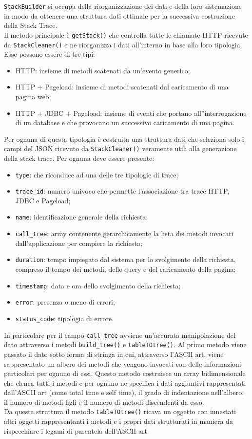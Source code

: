 \texttt{StackBuilder} si occupa della riorganizzazione dei dati e della loro sistemazione in modo da ottenere una struttura dati ottimale per la successiva costruzione della Stack Trace.\\
Il metodo principale è \texttt{getStack()} che controlla tutte le chiamate HTTP ricevute da \texttt{StackCleaner()} e ne riorganizza i dati all'interno in base alla loro tipologia. Esse possono essere di tre tipi:
	\begin{itemize}
		\item HTTP: insieme di metodi scatenati da un'evento generico;
		\item HTTP + Pageload: insieme di metodi scatenati dal caricamento di una pagina web;
		\item HTTP + JDBC + Pageload: insieme di eventi che portano all''interrogazione di un database e che provocano un successivo caricamento di una pagina.
	\end{itemize}
	Per ognuna di questa tipologia è costruita una struttura dati che seleziona solo i campi del JSON ricevuto da \texttt{StackCleaner()} veramente utili alla generazione della stack trace. Per ognuna deve essere presente:
	\begin{itemize}
		\item \texttt{type}: che riconduce ad una delle tre tipologie di trace;
		\item \texttt{trace\_id}: numero univoco che permette l'associazione tra trace HTTP, JDBC e Pageload;
		\item \texttt{name}: identificazione generale della richiesta;
		\item \texttt{call\_tree}: array contenente gerarchicamente la lista dei metodi invocati dall'applicazione per compiere la richiesta;
		\item \texttt{duration}: tempo impiegato dal sistema per lo svolgimento della richiesta, compreso il tempo dei metodi, delle query e del caricamento della pagina;
		\item \texttt{timestamp}: data e ora dello svolgimento della richiesta;
		\item \texttt{error}: presenza o meno di errori;
		\item \texttt{status\_code}: tipologia di errore.
	\end{itemize}
	In particolare per il campo \texttt{call\_tree} avviene un'accurata manipolazione del dato attraverso i metodi \texttt{build\_tree()} e \texttt{tableTOtree()}. Al primo metodo viene  passato il dato sotto forma di stringa in cui, attraverso l'ASCII art, viene rappresentato un albero dei metodi che vengono invocati con delle informazioni particolari per ognuno di essi. Questo metodo costruisce un array bidimensionale che elenca tutti i metodi e per ognuno ne specifica i dati aggiuntivi rappresentati dall'ASCII art (come total time e self time), il grado di indentazione nell'albero, il numero di metodi figli e il numero di metodi discendenti da esso. \\ Da questa struttura il metodo \texttt{tableTOtree()} ricava un oggetto con innestati altri oggetti rappresentanti i metodi e i propri dati strutturati in maniera da rispecchiare i legami di parentela dell'ASCII art.
